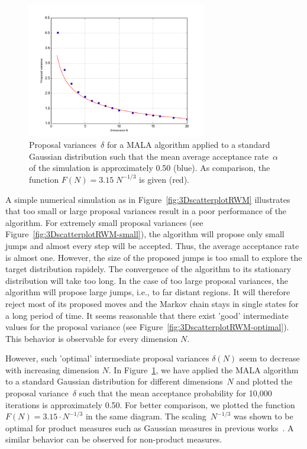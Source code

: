 \begin{figure}[htb]
\begin{center}
  \includegraphics[width=0.7\textwidth]{proposalvariancesForDimensions}
\end{center}
  \caption{Proposal variances~$\delta$ for a MALA algorithm applied to a standard Gaussian distribution such that the mean average acceptance rate~$\alpha$ of the simulation is approximately 0.50 (blue). As comparison, the function $F(N) = 3.15 \; N^{-1/3}$ is given (red).}
  \label{fig:proposalVarianceForDimensions}
\end{figure}

A simple numerical simulation as in Figure~\ref{fig:3DscatterplotRWM} illustrates that too small or large proposal variances result in a poor performance of the algorithm. For extremely small proposal variances (see Figure~\ref{fig:3DscatterplotRWM-small}), the algorithm will propose only small jumps and almost every step will be accepted. Thus, the average acceptance rate is almost one. However, the size of the proposed jumps is too small to explore the target distribution rapidely. The convergence of the algorithm to its stationary distribution will take too long. In the case of too large proposal variances, the algorithm will propose large jumps, i.e., to far distant regions. It will therefore reject most of its proposed moves and the Markov chain stays in single states for a long period of time. It seems reasonable that there exist 'good' intermediate values for the proposal variance (see Figure~\ref{fig:3DscatterplotRWM-optimal}). This behavior is observable for every dimension $N$.

However, such 'optimal' intermediate proposal variances $ \delta(N) $ seem to decrease with increasing dimension $N$. In Figure~\ref{fig:proposalVarianceForDimensions}, we have applied the MALA algorithm to a standard Gaussian distribution for different dimensions~$N$ and plotted the proposal variance~$\delta$ such that the mean acceptance probability for 10,000 iterations is approximately 0.50. For better comparison, we plotted the function $F(N) = 3.15 \cdot N^{-1/3}$ in the same diagram. The scaling~$N^{- 1/3}$ was shown to be optimal for product measures such as Gaussian measures in previous works~\autocite{Roberts1997, Roberts1998}. A similar behavior can be observed for non-product measures.

